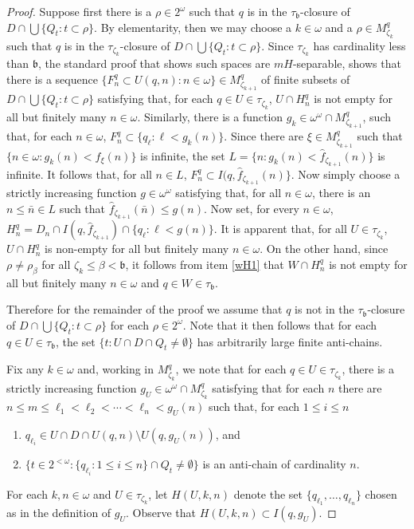 \documentclass{amsart}
\theoremstyle{definition}
\theoremstyle{remark}
\begin{document}
\begin{proof}
Suppose first there is a $\rho\in 2^\omega$ such
that $q$ is in the $\tau_{\mathfrak b}$-closure of $D\cap \bigcup\{Q_t : t\subset \rho\}$.
By elementarity, then we may choose  a $k\in\omega$
and a $\rho\in M^q_{\zeta_k}$  such that $q$ is in the $\tau_{\zeta_k}$-closure
of $D\cap \bigcup\{Q_t : t\subset \rho\}$. 
Since $\tau_{\zeta_k}$ has cardinality less than $\mathfrak b$,  the 
standard proof that shows such spaces are $mH$-separable, shows
that   there is a sequence $\{ F^q_n \subset U(q,n)
: n\in\omega\}\in M^q_{\zeta_{k+1}}$
 of finite subsets of $D\cap \bigcup\{Q_t : t\subset \rho\}$ 
 satisfying that, for each $q\in U\in \tau_{\zeta_k}$,
  $U\cap H^q_n$ is not empty for all but finitely many $n\in\omega$.
  Similarly, there is a  function $g_k\in \omega^\omega\cap M^q_{\zeta_{k+1}}$,
  such that, for each $n\in\omega$, $F^q_n\subset \{ q_\ell : \ell < g_k(n)\}$. 
  Since there are $\xi \in M^q_{\zeta_{k+1}}$ such that 
   $\{ n \in\omega : g_k(n) < f_{\xi }(n)\}$ is infinite, 
   the set $L = \{ n : g_k(n) < \hat f_{\zeta_{k+1}}(n)\}$ is infinite.
   It follows that, for all $n\in L$, $F^q_n \subset I(q,\hat f_{\zeta_{k+1}}(n)\}$.
   Now simply choose a strictly increasing function $g\in\omega^\omega$
   satisfying that, for all $n\in \omega$, there is an $n\leq\bar n\in L$ such
   that $\hat f_{\zeta_{k+1}}(\bar n) \leq g(n)$.  Now set, for every
   $n\in\omega$, $H^q_n = D_n  \cap I(q,\hat f_{\zeta_{k+1}})\cap \{ q_\ell
     : \ell <g(n)\}$. 
     It is apparent that, for all $U\in \tau_{\zeta_k}$, $U\cap H^q_n$ is 
     non-empty for all but finitely many $n\in\omega$. On the other 
     hand,   
since $\rho\neq \rho_\beta$
  for all $\zeta_k \leq \beta < \mathfrak b$, it follows from item \ref{wH1} 
  that $W\cap H^q_n$ is not empty for all but finitely many $n\in\omega$
  and $q\in W\in \tau_{\mathfrak b}$.
\medskip

  Therefore for the remainder of the proof we assume that $q$ is not in
  the $\tau_{\mathfrak b}$-closure of $D\cap 
  \bigcup\{Q_t : t\subset \rho\}$ for each $\rho\in 2^\omega$.  
  Note that it then follows that for each $q\in U\in \tau_{\mathfrak b}$, 
   the set $\{ t : U\cap D \cap Q_t\neq\emptyset \} $ has arbitrarily large
   finite anti-chains.
\medskip

  
 Fix any $k\in\omega$   and, working in $M^q_{\zeta_k}$, we note
 that   for each
   $q\in U\in \tau_{\zeta_k}$, 
    there is a strictly increasing function $g_U\in \omega^\omega
   \cap M^q_{\zeta_k}$ satisfying that for each $n$
   there are $n\leq m\leq  \ell_1<\ell_2<\cdots<\ell_n < g_U(n)$ such that,
   for each $1\leq i\leq n$
\begin{enumerate}
\item  $q_{\ell_i} \in U\cap  D \cap U(q,n)\setminus U(q,g_U(n))$, and
\item   $\{ t\in 2^{<\omega} : \{q_{\ell_i} : 1\leq i\leq n\}\cap Q_t\neq\emptyset\}$
is an anti-chain of cardinality $n$. 
\end{enumerate}  
For each $k,n\in\omega$ and $U\in \tau_{\zeta_k}$, let $H(U,k,n)$ 
denote the set $\{ q_{\ell_1},\ldots, q_{\ell_n}\}$ chosen as in
the definition of $g_U$. Observe that $H(U,k,n)\subset I(q, g_U)$.


\end{proof}
\end{document}
